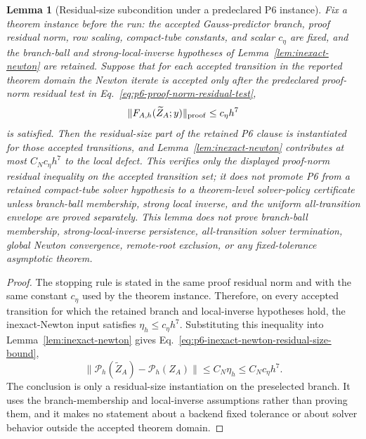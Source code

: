 \documentclass[preprint,12pt]{elsarticle}
\newtheorem{lemma}{Lemma}
\begin{document}
\begin{lemma}[Residual-size subcondition under a predeclared P6 instance]
\label{lem:p6-residual-size-subcondition}
Fix a theorem instance before the run: the accepted Gauss-predictor branch,
proof residual norm, row scaling, compact-tube constants, and scalar
\(c_\eta\) are fixed, and the branch-ball and strong-local-inverse
hypotheses of Lemma~\ref{lem:inexact-newton} are retained.  Suppose that for
each accepted transition in the reported theorem domain the Newton iterate is
accepted only after the predeclared proof-norm residual test in
Eq.~\eqref{eq:p6-proof-norm-residual-test},
\begin{equation}
\label{eq:p6-proof-norm-residual-test}
  \|F_{A,h}(\widetilde Z_A;y)\|_{\rm proof}\le c_\eta h^7
\end{equation}
is satisfied.  Then the
residual-size part of the retained P6 clause is
instantiated for those accepted transitions, and
Lemma~\ref{lem:inexact-newton} contributes at most \(C_Nc_\eta h^7\) to the
local defect.  This verifies only the displayed proof-norm residual
inequality on the accepted transition set; it does not promote P6 from a
retained compact-tube solver hypothesis to a theorem-level solver-policy
certificate unless branch-ball membership, strong local inverse, and the
uniform all-transition envelope are proved separately.  This lemma does not
prove branch-ball membership,
strong-local-inverse persistence, all-transition solver termination, global
Newton convergence, remote-root exclusion, or any fixed-tolerance
asymptotic theorem.
\end{lemma}

\begin{proof}
The stopping rule is stated in the same proof residual norm and with the same
constant \(c_\eta\) used by the theorem instance.  Therefore, on every
accepted transition for which the retained branch and local-inverse
hypotheses hold, the inexact-Newton input satisfies
\(\eta_h\le c_\eta h^7\).  Substituting this inequality into
Lemma~\ref{lem:inexact-newton} gives Eq.~\eqref{eq:p6-inexact-newton-residual-size-bound},
\begin{equation}
\label{eq:p6-inexact-newton-residual-size-bound}
  \|\mathcal P_h(\widetilde Z_A)-\mathcal P_h(Z_A)\|
  \le C_N\eta_h\le C_Nc_\eta h^7 .
\end{equation}
The conclusion is only a residual-size instantiation on the preselected
branch.  It uses the branch-membership and local-inverse assumptions rather
than proving them, and it makes no statement about a backend fixed tolerance
or about solver behavior outside the accepted theorem domain.
\end{proof}
\end{document}
